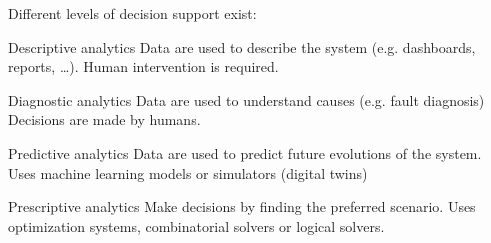 Different levels of decision support exist:
\begin{descriptionlist}
    \item[Descriptive analytics] 
        Data are used to describe the system (e.g. dashboards, reports, \dots).
        Human intervention is required.
            
    \item[Diagnostic analytics] 
        Data are used to understand causes (e.g. fault diagnosis)
        Decisions are made by humans.

    \item[Predictive analytics] 
        Data are used to predict future evolutions of the system.
        Uses machine learning models or simulators (digital twins)

    \item[Prescriptive analytics] 
        Make decisions by finding the preferred scenario.
        Uses optimization systems, combinatorial solvers or logical solvers.
\end{descriptionlist}


\newpage
\lohead{}
\lehead{}
